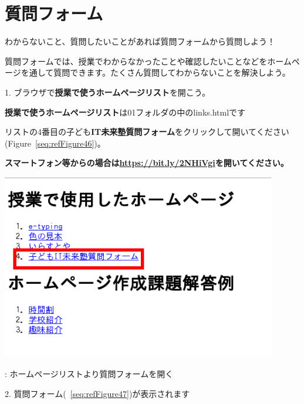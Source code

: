 \documentclass[a4paper,12pt]{jarticle}
\begin{document}
\section{質問フォーム}
わからないこと、質問したいことがあれば質問フォームから質問しよう！

質問フォームでは、授業でわからなかったことや確認したいことなどをホームページを通して質問できます。たくさん質問してわからないことを解決しよう。

1.
ブラウザで\textbf{授業で使うホームページリスト}を開こう。

\textbf{授業で使うホームページリスト}は01フォルダの中のlinks.htmlです

リストの4番目の子ども\textbf{IT未来塾質問フォーム}をクリックして開いてください(Figure~\ref{seq:refFigure46})。


\bigskip

{\bfseries
  スマートフォン等からの場合は\url{https://bit.ly/2NHiVgi}を開いてください。}



\centering
\begin{minipage}{\textwidth}
  {\upshape
    \includegraphics[width=0.9\textwidth]{textbook-img245.png}
    \flushleft

    \bigskip
    {\theFigure\label{seq:refFigure46}}:
    ホームページリストより質問フォームを開く}
\end{minipage}

\bigskip

\bigskip

2.
質問フォーム(~\ref{seq:refFigure47})が表示されます
\end{document}
